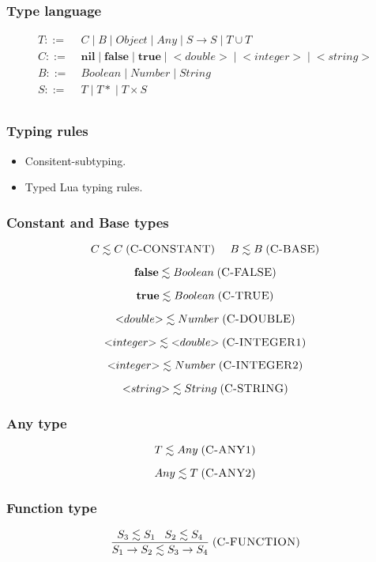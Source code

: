 \documentclass{beamer}
\newcommand{\mylabel}[1]{\; (\textsc{#1})}
\newcommand{\pipe}{|\;}
\begin{document}
\begin{frame}
\frametitle{Type language}
\begin{align*}
T ::= \; & C \; \pipe B \; \pipe Object \; \pipe Any \; \pipe
S \rightarrow S \; \pipe T \cup T\\
C ::= \; & \mathbf{nil} \; \pipe \mathbf{false} \; \pipe \mathbf{true} \;
\pipe {<}double{>} \; \pipe {<}integer{>} \; \pipe {<}string{>}\\
B ::= \; & Boolean \; \pipe Number \; \pipe String\\
S ::= \; & T \; \pipe {T*} \; \pipe T \times S\\ 
\end{align*}
\end{frame}

\begin{frame}
\frametitle{Typing rules}
\begin{itemize}
\item Consitent-subtyping.
\item Typed Lua typing rules.
\end{itemize}
\end{frame}

\begin{frame}
\frametitle{Constant and Base types}
\[
C \lesssim C
\mylabel{C-CONSTANT}
\;\;\;\;\;
B \lesssim B
\mylabel{C-BASE}
\]

\[
\mathbf{false} \lesssim Boolean
\mylabel{C-FALSE}
\]

\[
\mathbf{true} \lesssim Boolean
\mylabel{C-TRUE}
\]

\[
{<}double{>} \lesssim Number
\mylabel{C-DOUBLE}
\]

\[
{<}integer{>} \lesssim {<}double{>}
\mylabel{C-INTEGER1}
\]

\[
{<}integer{>} \lesssim Number
\mylabel{C-INTEGER2}
\]

\[
{<}string{>} \lesssim String
\mylabel{C-STRING}
\]
\end{frame}

\begin{frame}
\frametitle{Any type}
\[
T \lesssim Any
\mylabel{C-ANY1}
\]

\[
Any \lesssim T
\mylabel{C-ANY2}
\]
\end{frame}

\begin{frame}
\frametitle{Function type}
\[
\frac{S_{3} \lesssim S_{1} \;\;\; S_{2} \lesssim S_{4}}
     {S_{1} \rightarrow S_{2} \lesssim S_{3} \rightarrow S_{4}}
\mylabel{C-FUNCTION}
\]
\end{frame}
\end{document}
